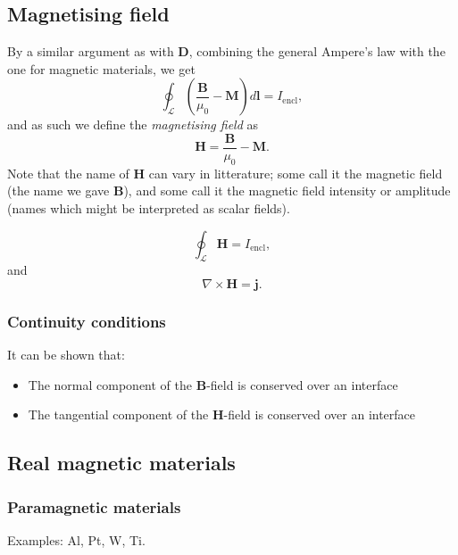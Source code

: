 \documentclass[a4paper, 12pt]{article}
\renewcommand{\vec}[1]{\bm{#1}}
\newcommand{\D}{\ensuremath{\vec{D}}}
\renewcommand{\j}{\ensuremath{\vec{j}}}
\newcommand{\B}{\ensuremath{\vec{B}}}
\renewcommand{\H}{\ensuremath{\vec{H}}}
\begin{document}
    \subsection{Magnetising field}
        By a similar argument as with \D, combining the general Ampere's law with the one for magnetic materials, we get
        \begin{equation*}
            \oint_\mathcal{L}\left(\frac{\B}{\mu_0}-\vec{M}\right)d\vec{l} = I_{\text{encl}},
        \end{equation*}
        and as such we define the \textit{magnetising field} as 
        \begin{equation}
            \H = \frac{\B}{\mu_0}-\vec{M}.
        \end{equation}
        Note that the name of \H{} can vary in litterature; some call it the magnetic field 
        (the name we gave \B), and some call it the magnetic field intensity or amplitude 
        (names which might be interpreted as scalar fields).

        \begin{equation}
            \oint_\mathcal{L}\H = I_{\text{encl}},
        \end{equation}
        and 
        \begin{equation}
            \nabla\times\H = \j.
        \end{equation}
        
        \subsubsection{Continuity conditions}
            It can be shown that:
            \begin{itemize}
                \item The normal component of the \B-field is conserved over an interface
                \item The tangential component of the \H-field is conserved over an interface
            \end{itemize}

    \subsection{Real magnetic materials}
        \subsubsection{Paramagnetic materials}
            Examples: Al, Pt, W, Ti.
\end{document}
